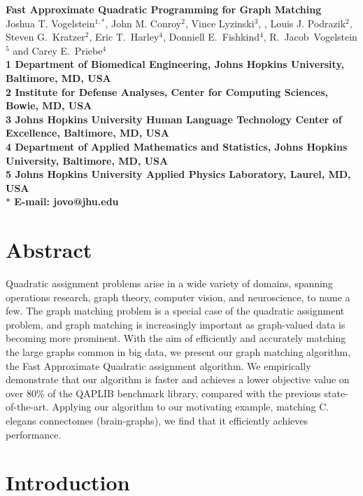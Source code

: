 \documentclass[10pt]{article}
\date{}
\begin{document}
\begin{flushleft}
{\Large
\textbf{Fast Approximate Quadratic Programming for Graph Matching}
}
\\
Joshua T. Vogelstein$^{1,\ast}$, John M. Conroy$^{2}$, Vince Lyzinski$^{3}$,
, Louis J. Podrazik$^{2}$,  Steven G.~Kratzer$^{2}$, Eric T.~Harley$^{4}$,
Donniell E.~Fishkind$^{4}$, 
		R.~Jacob~Vogelstein$^{5}$
        and Carey E.~Priebe$^{4}$
\\        
\bf{1} Department of Biomedical Engineering, Johns Hopkins University, Baltimore, MD, USA
\\
\bf{2} Institute for Defense Analyses, Center for Computing Sciences, Bowie, MD, USA
\\
\bf{3} Johns Hopkins University Human Language Technology Center of Excellence, Baltimore, MD, USA
\\
\bf{4} Department of Applied Mathematics and Statistics, Johns Hopkins University, Baltimore, MD, USA
\\
\bf{5}  Johns Hopkins University Applied Physics Laboratory, Laurel, MD, USA
\\
$\ast$ E-mail: jovo@jhu.edu
\end{flushleft}

 
\section*{Abstract}
Quadratic assignment problems arise in a wide variety of domains, spanning operations research, graph theory, computer vision, and neuroscience, to name a few.  The graph matching problem is a special case of the quadratic assignment problem,
and graph matching is increasingly important as
graph-valued data is becoming more prominent.  With the aim of efficiently and accurately matching the large graphs common in big data,
we present our graph matching algorithm, the Fast Approximate Quadratic assignment algorithm. 
We empirically demonstrate that our algorithm is faster and achieves a lower objective value on over $80\%$ of the QAPLIB benchmark library, compared with the previous state-of-the-art.  Applying our algorithm to our motivating example, matching C. elegans connectomes (brain-graphs), we find that it efficiently achieves  performance.


\section{Introduction}
\end{document}
